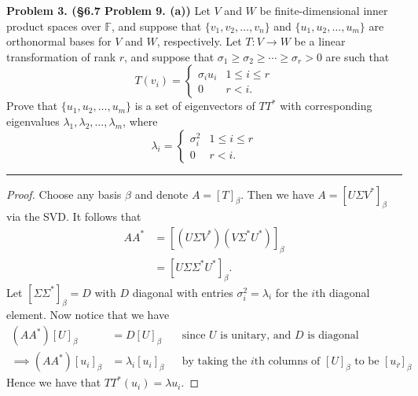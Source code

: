 \documentclass[leqno]{article}
\theoremstyle{nonumberplain}
\newtheorem{proof}{Proof}
\begin{document}
\pagebreak




\noindent\textbf{Problem 3. (\S 6.7  Problem 9. (a))} Let $V$ and $W$ be finite-dimensional inner product spaces over $\mathbb{F}$, and suppose that $\{v_1,v_2,\dots,v_n\}$ and $\{u_1,u_2,\dots,u_m\}$ are orthonormal bases for $V$ and $W$, respectively. Let $T\colon V\to W$ be a linear transformation of rank $r$, and suppose that $\sigma_1 \geq \sigma_2 \geq \cdots \geq \sigma_r >0$ are such that
\[
T(v_i)=\begin{cases}
\sigma_i u_i & 1\leq i \leq r\\
0 & r<i.
\end{cases}
\]
Prove that $\{u_1,u_2,\dots,u_m\}$ is a set of eigenvectors of $TT^*$ with corresponding eigenvalues $\lambda_1,\lambda_2,\dots,\lambda_m$, where
\[
\lambda_i =\begin{cases}
\sigma_i^2 & 1\leq i \leq r\\
0 & r<i.
\end{cases}
\]

\noindent\rule[0.5ex]{\linewidth}{1pt}

\begin{proof}
Choose any basis $\beta$ and denote $A=[T]_\beta$. Then we have $A=[U\Sigma V^*]_\beta$ via the SVD. It follows that
\begin{align*}
AA^* &= [(U \Sigma V^*)(V\Sigma^* U^*)]_\beta\\
&= [U \Sigma \Sigma^* U^*]_\beta.
\end{align*}
Let $[\Sigma \Sigma^*]_\beta=D$ with $D$ diagonal with entries $\sigma_i^2=\lambda_i$ for the $i$th diagonal element. Now notice that we have
\begin{align*}
(AA^*)[U]_\beta&=D[U]_\beta &&\textrm{since $U$ is unitary, and $D$ is diagonal}\\
\implies (AA^*)[u_i]_\beta &= \lambda_i [u_i]_\beta &&\textrm{by taking the $i$th columns of $[U]_\beta$ to be $[u_i]_\beta$}.
\end{align*}
Hence we have that $TT^*(u_i)=\lambda u_i$.
\end{proof}

\pagebreak
\end{document}
